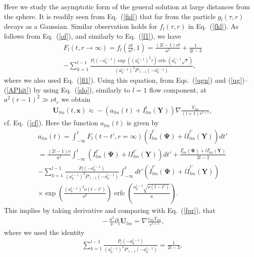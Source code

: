 \documentclass[aps,prx,twocolumn,amsmath,amssymb,amsfonts]{revtex4-2}
\DeclareMathOperator\erfc{erfc}
\begin{document}
Here we study the asymptotic form of the general solution at large distances from the sphere. It is readily seen from Eq.~(\ref{fid}) that far from the particle $g_l(\tau, r)$ decays as a Gaussian.
Similar observation holds for $f_l(\tau, r)$ in Eq.~(\ref{fkl}). As follows from Eq.~(\ref{of}), and similarly to Eq.~(\ref{f1}), we have
\begin{eqnarray}&&
F_{l}(t, r \rightarrow \infty)=f_{l}\left(\frac{\nu t}{a^2}, 1\right)\!=\!\frac{(2l\!-\!1)\nu t}{a^2}+\frac{1}{2l-3}
\nonumber\\&&
-\sum_{k=1}^{l-1}\frac{P_{l}(-a_k^{l-1})\exp\left((a_k^{l-1})^2\tau\right)
\erfc\left(a_k^{l-1}\sqrt{\tau}\right)}{\left(a_k^{l-1}\right)^3P'_{l-1}(-a_k^{l-1})},
\end{eqnarray}
where we also used Eq.~(\ref{fl1}). Using this equation,
from Eqs.~(\ref{ugn}) and (\ref{ug})--(\ref{APhit}) by using Eq.~(\ref{slo}), similarly to $l\!=\!1$ flow component, at $a^2(r-1)^2\gg \nu t_c$ we obtain
\begin{eqnarray}&&\!\!\!\!\!\!
\bm U_{lm}(t, \bm x) \!\approx \!-\left(a_{lm}(t)+I^{t}_{lm}(\bm Y)\right)\nabla \frac{Y_{lm}}{(l+1)r^{l+1}},
\end{eqnarray}
cf. Eq.~(\ref{cf}). Here the function $a_{lm}(t)$ is given by
\begin{eqnarray}&&
a_{lm}(t)\! = \!\int_{-\infty}^{t}\! F_l(t\!-\!t', r=\infty) ( \dot{I}_{lm}^{t'}(\bm \Psi) \!+\! l \dot{I}_{lm}^{t'}(\bm Y))dt'\nonumber\\&&
=\!\frac{(2l\!-\!1)\nu }{a^2}\!\int_{-\infty}^{t}\! \!\!(I_{lm}^{t'}(\bm \Psi) \!+\! l I_{lm}^{t'}(\bm Y))dt'\!+\!\frac{I_{lm}^{t}(\bm \Psi) \!+\! l I_{lm}^{t}(\bm Y)}{2l\!-\!3}
\nonumber\\&&
-\!\sum_{k=1}^{l-1} \! \!\frac{P_{l}(-a_k^{l-1})}{\left(a_k^{l-1}\right)^3P'_{l-1}(-a_k^{l-1})}\int_{-\infty}^{t}\! dt' ( \dot{I}_{lm}^{t'}(\bm \Psi) \!+\! l \dot{I}_{lm}^{t'}(\bm Y))
\nonumber\\&&\times\exp\left(\frac{(a_k^{l-1})^2\nu (t-t')}{a^2}\right)\erfc\left(\frac{a_k^{l-1}\sqrt{\nu (t-t')}}{a}\right). \label{alm}
\end{eqnarray}
This implies by taking derivative and comparing with Eq.~(\ref{fpr}), that
\begin{eqnarray}&&\!\!\!\!
-\frac{a^2}{\nu}\partial_t\bm U_{lm}\!=\!\nabla \frac{c_{lm}Y_{lm}}{r^{l+1}},%
\end{eqnarray}
where we used the identity
\begin{eqnarray}&&
\sum_{k=1}^{l-1}\frac{P_{l}(-a_k^{l-1})}{\left(a_k^{l-1}\right)^3P'_{l-1}(-a_k^{l-1})}\!=\!\frac{1}{2l-3}, \label{sumrul}
\end{eqnarray}
\end{document}
